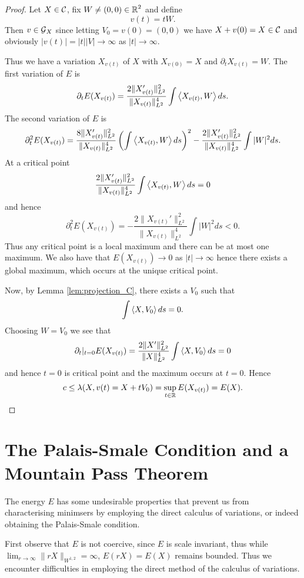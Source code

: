\documentclass[12pt]{article}
\begin{document}
\begin{proof}
Let \(X \in \operatorname{\mathcal{C}}\), fix \(W \ne (0, 0) \in \operatorname{\mathbb{R}}^2\) and define
\[
v(t) = t W.
\]
Then \(v \in \operatorname{\mathcal{G}}_X\) since letting \(V_0 = v(0) = (0, 0)\) we have \(X + v(0) = X \in \operatorname{\mathcal{C}}\) and obviously \(|v(t)| = |t| |V| \to \infty\) as \(|t| \to \infty\).

Thus we have a variation \(X_{v(t)}\) of \(X\) with \(X_{v(0)} = X\) and \(\partial_t X_{v(t)} = W\). The first variation of \(E\) is
\[
\partial_t E(X_{v(t)}) = \frac{2\|X_{v(t)}'\|_{L^2}^2}{\|X_{v(t)}\|_{L^2}^4} \int \left\langle{X_{v(t)}},{W}\right\rangle ds.
\]
The second variation of \(E\) is
\[
\partial_t^2 E(X_{v(t)}) = \frac{8\|X_{v(t)}'\|_{L^2}^2}{\|X_{v(t)}\|_{L^2}^4} \left(\int \left\langle{X_{v(t)}},{W}\right\rangle ds\right)^2 - \frac{2\|X_{v(t)}'\|_{L^2}^2}{\|X_{v(t)}\|_{L^2}^4} \int |W|^2 ds.
\]
At a critical point
\[
\frac{2\|X_{v(t)}'\|_{L^2}^2}{\|X_{v(t)}\|_{L^2}^4} \int \left\langle{X_{v(t)}},{W}\right\rangle ds = 0
\]
and hence
\[
\partial_t^2 E(X_{v(t)}) = - \frac{2\|X_{v(t)}'\|_{L^2}^2}{\|X_{v(t)}\|_{L^2}^4} \int |W|^2 ds < 0.
\]
Thus any critical point is a local maximum and there can be at most one maximum. We also have that \(E(X_{v(t)}) \to 0\) as \(|t| \to \infty\) hence there exists a global maximum, which occurs at the unique critical point.

Now, by Lemma \ref{lem:projection_C}, there exists a \(V_0\) such that
\[
\int \left\langle{X},{V_0}\right\rangle ds = 0.
\]
Choosing \(W = V_0\) we see that
\[
\partial_t|_{t=0} E(X_{v(t)}) = \frac{2\|X'\|_{L^2}^2}{\|X\|_{L^2}^4} \int \left\langle{X},{V_0}\right\rangle ds = 0
\]
and hence \(t = 0\) is critical point and the maximum occurs at \(t = 0\). Hence
\[
c \leq \lambda(X, v(t) = X + tV_0) = \sup_{t \in \operatorname{\mathbb{R}}} E(X_{v(t)}) = E(X).
\]
\end{proof}

\section{The Palais-Smale Condition and a Mountain Pass Theorem}
\label{sec-3}

The energy \(E\) has some undesirable properties that prevent us from characterising minimsers by employing the direct calculus of variations, or indeed obtaining the Palais-Smale condition.

First observe that \(E\) is not coercive, since \(E\) is scale invariant, thus while \(\lim_{r\to \infty} \|rX\|_{W^{1,2}} = \infty\), \(E(r X) = E(X)\) remains bounded. Thus we encounter difficulties in employing the direct method of the calculus of variations.
\end{document}
